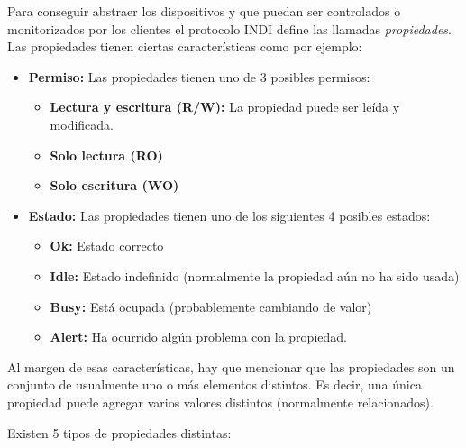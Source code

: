 Para conseguir abstraer los dispositivos y que puedan ser controlados o monitorizados por los clientes el protocolo INDI define las llamadas \textit{propiedades}. Las propiedades tienen ciertas características como por ejemplo:

\begin{itemize}
  \item \textbf{Permiso:} Las propiedades tienen uno de 3 posibles permisos:
    \begin{itemize}
     \item \textbf{Lectura y escritura (R/W):} La propiedad puede ser leída y modificada.
     \item \textbf{Solo lectura (RO)}
     \item \textbf{Solo escritura (WO)}
    \end{itemize}

  \item \textbf{Estado:} Las propiedades tienen uno de los siguientes 4 posibles estados:
    \begin{itemize}
     \item \textbf{Ok:} Estado correcto
     \item \textbf{Idle:} Estado indefinido (normalmente la propiedad aún no ha sido usada)
     \item \textbf{Busy:} Está ocupada (probablemente cambiando de valor)
     \item \textbf{Alert:} Ha ocurrido algún problema con la propiedad.
    \end{itemize}
\end{itemize}

\bigskip
Al margen de esas características, hay que mencionar que las propiedades son un conjunto de usualmente uno o más elementos distintos. Es decir, una única propiedad puede agregar varios valores distintos (normalmente relacionados).

Existen 5 tipos de propiedades distintas:


